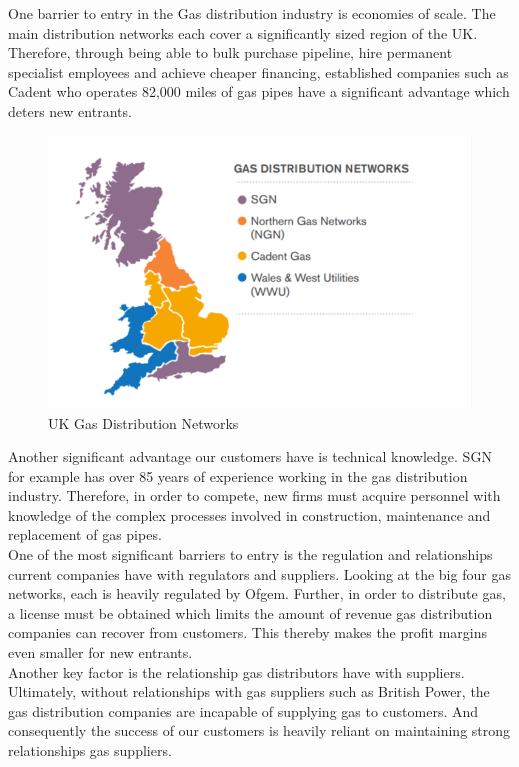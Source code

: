 \documentclass[11pt]{article}		%
\begin{document}
				One barrier to entry in the Gas distribution industry is economies of scale. The main distribution networks each cover a significantly sized region of the UK. Therefore, through being able to bulk purchase pipeline, hire permanent specialist employees and achieve cheaper financing, established companies such as Cadent who operates 82,000 miles of gas pipes have a significant advantage which deters new entrants. \\
					\begin{figure}[h]
			    \centering
		    	\includegraphics[scale=0.8]{distribution.pdf}
			    \caption{UK Gas Distribution Networks} %
		    	\label{distrit}
	        	\end{figure}
				
				Another significant advantage our customers have is technical knowledge. SGN for example has over 85 years of experience working in the gas distribution industry. Therefore, in order to compete, new firms must acquire personnel with knowledge of the complex processes involved in construction, maintenance and replacement of gas pipes. \\
				One of the most significant barriers to entry is the regulation and relationships current companies have with regulators and suppliers. Looking at the big four gas networks, each is heavily regulated by Ofgem. Further, in order to distribute gas, a license must be obtained which limits the amount of revenue gas distribution companies can recover from customers. This thereby makes the profit margins even smaller for new entrants. \\
	            \hspace*{3ex}Another key factor is the relationship gas distributors have with suppliers. Ultimately, without relationships with gas suppliers such as British Power, the gas distribution companies are incapable of supplying gas to customers. And consequently the success of our customers is heavily reliant on maintaining strong relationships gas suppliers.
\end{document}
